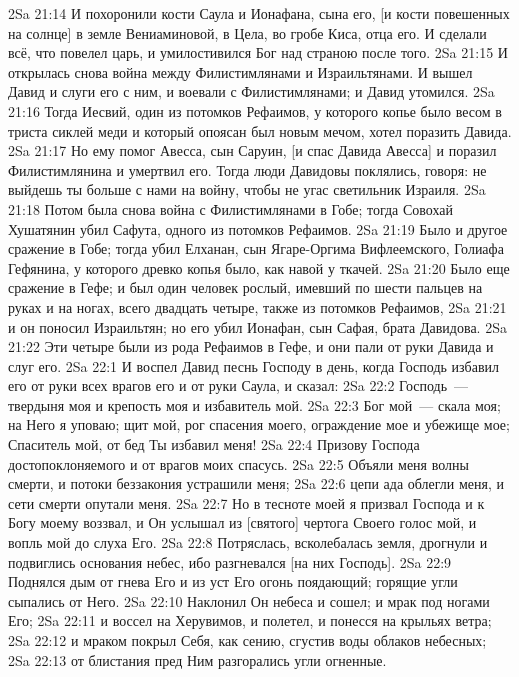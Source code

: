 \vs 2Sa 21:14 И похоронили кости Саула и Ионафана, сына его, [и кости повешенных на солнце] в земле Вениаминовой, в Цела, во гробе Киса, отца его. И сделали всё, что повелел царь, и умилостивился Бог над страною после того.
\rsbpar\vs 2Sa 21:15 И открылась снова война между Филистимлянами и Израильтянами. И вышел Давид и слуги его с ним, и воевали с Филистимлянами; и Давид утомился.
\vs 2Sa 21:16 Тогда Иесвий, один из потомков Рефаимов, у которого копье было весом в триста сиклей меди и который опоясан был новым мечом, хотел поразить Давида.
\vs 2Sa 21:17 Но ему помог Авесса, сын Саруин, [и спас Давида Авесса] и поразил Филистимлянина и умертвил его. Тогда люди Давидовы поклялись, говоря: не выйдешь ты больше с нами на войну, чтобы не угас светильник Израиля.
\vs 2Sa 21:18 Потом была снова война с Филистимлянами в Гобе; тогда Совохай Хушатянин убил Сафута, одного из потомков Рефаимов.
\vs 2Sa 21:19 Было и другое сражение в Гобе; тогда убил Елханан, сын Ягаре-Оргима Вифлеемского, Голиафа Гефянина, у которого древко копья было, как навой у ткачей.
\vs 2Sa 21:20 Было еще сражение в Гефе; и был  один человек рослый, имевший по шести пальцев на руках и на ногах, всего двадцать четыре, также из потомков Рефаимов,
\vs 2Sa 21:21 и он поносил Израильтян; но его убил Ионафан, сын Сафая, брата Давидова.
\vs 2Sa 21:22 Эти четыре были из рода Рефаимов в Гефе, и они пали от руки Давида и слуг его.
\vs 2Sa 22:1 И воспел Давид песнь Господу в день, когда Господь избавил его от руки всех врагов его и от руки Саула, и сказал:
\vs 2Sa 22:2 Господь~--- твердыня моя и крепость моя и избавитель мой.
\vs 2Sa 22:3 Бог мой~--- скала моя; на Него я уповаю; щит мой, рог спасения моего, ограждение мое и убежище мое; Спаситель мой, от бед Ты избавил меня!
\vs 2Sa 22:4 Призову Господа достопоклоняемого и от врагов моих спасусь.
\vs 2Sa 22:5 Объяли меня волны смерти, и потоки беззакония устрашили меня;
\vs 2Sa 22:6 цепи ада облегли меня, и сети смерти опутали меня.
\vs 2Sa 22:7 Но в тесноте моей я призвал Господа и к Богу моему воззвал, и Он услышал из [святого] чертога Своего голос мой, и вопль мой  до слуха Его.
\vs 2Sa 22:8 Потряслась, всколебалась земля, дрогнули и подвиглись основания небес, ибо разгневался [на них Господь].
\vs 2Sa 22:9 Поднялся дым от гнева Его и из уст Его огонь поядающий; горящие угли сыпались от Него.
\vs 2Sa 22:10 Наклонил Он небеса и сошел; и мрак под ногами Его;
\vs 2Sa 22:11 и воссел на Херувимов, и полетел, и понесся на крыльях ветра;
\vs 2Sa 22:12 и мраком покрыл Себя, как сению, сгустив воды облаков небесных;
\vs 2Sa 22:13 от блистания пред Ним разгорались угли огненные.
